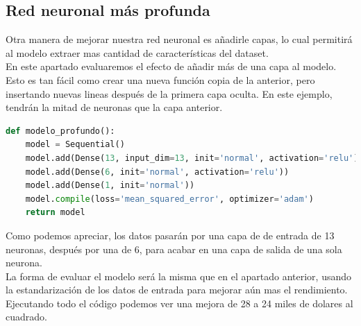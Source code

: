 \subsection{Red neuronal más profunda}
Otra manera de mejorar nuestra red neuronal es añadirle capas, lo cual permitirá al modelo extraer mas cantidad de características del dataset.\\
En este apartado evaluaremos el efecto de añadir más de una capa al modelo. Esto es tan fácil como crear una nueva función copia de la anterior, pero insertando nuevas lineas después de la primera capa oculta. En este ejemplo, tendrán la mitad de neuronas que la capa anterior.
\begin{lstlisting}[language=Python]
def modelo_profundo():
	model = Sequential()
	model.add(Dense(13, input_dim=13, init='normal', activation='relu'))
	model.add(Dense(6, init='normal', activation='relu'))
	model.add(Dense(1, init='normal'))
	model.compile(loss='mean_squared_error', optimizer='adam')
	return model
\end{lstlisting}
Como podemos apreciar, los datos pasarán por una capa de de entrada de 13 neuronas, después por una de 6, para acabar en una capa de salida de una sola neurona.\\
La forma de evaluar el modelo será la misma que en el apartado anterior, usando la estandarización de los datos de entrada para mejorar aún mas el rendimiento.\\
Ejecutando todo el código podemos ver una mejora de 28 a 24 miles de dolares al cuadrado.
